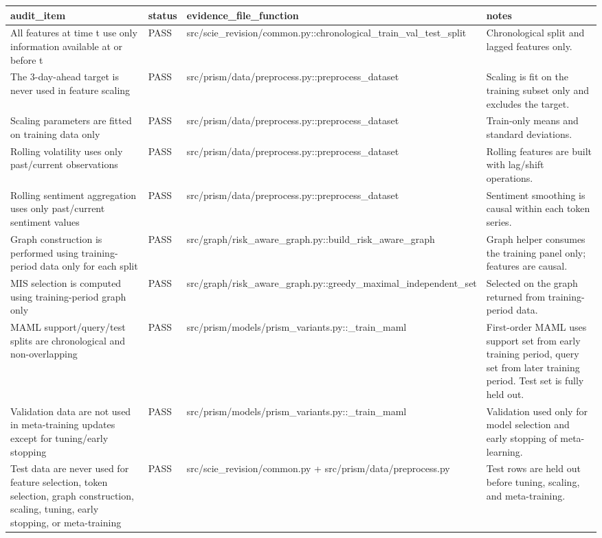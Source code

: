 \begin{table}[htbp]
\centering
\begin{tabular}{llll}
\hline
audit_item & status & evidence_file_function & notes \\
\hline
All features at time t use only information available at or before t & PASS & src/scie_revision/common.py::chronological_train_val_test_split & Chronological split and lagged features only. \\
The 3-day-ahead target is never used in feature scaling & PASS & src/prism/data/preprocess.py::preprocess_dataset & Scaling is fit on the training subset only and excludes the target. \\
Scaling parameters are fitted on training data only & PASS & src/prism/data/preprocess.py::preprocess_dataset & Train-only means and standard deviations. \\
Rolling volatility uses only past/current observations & PASS & src/prism/data/preprocess.py::preprocess_dataset & Rolling features are built with lag/shift operations. \\
Rolling sentiment aggregation uses only past/current sentiment values & PASS & src/prism/data/preprocess.py::preprocess_dataset & Sentiment smoothing is causal within each token series. \\
Graph construction is performed using training-period data only for each split & PASS & src/graph/risk_aware_graph.py::build_risk_aware_graph & Graph helper consumes the training panel only; features are causal. \\
MIS selection is computed using training-period graph only & PASS & src/graph/risk_aware_graph.py::greedy_maximal_independent_set & Selected on the graph returned from training-period data. \\
MAML support/query/test splits are chronological and non-overlapping & PASS & src/prism/models/prism_variants.py::_train_maml & First-order MAML uses support set from early training period, query set from later training period. Test set is fully held out. \\
Validation data are not used in meta-training updates except for tuning/early stopping & PASS & src/prism/models/prism_variants.py::_train_maml & Validation used only for model selection and early stopping of meta-learning. \\
Test data are never used for feature selection, token selection, graph construction, scaling, tuning, early stopping, or meta-training & PASS & src/scie_revision/common.py + src/prism/data/preprocess.py & Test rows are held out before tuning, scaling, and meta-training. \\

\end{tabular}
\end{table}
